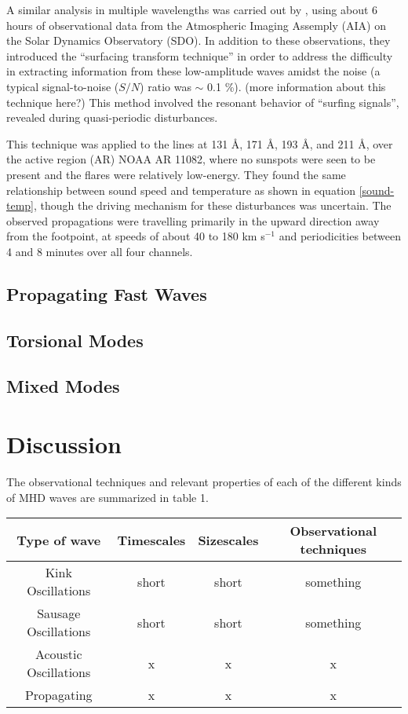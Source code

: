 \documentclass[preprint2]{aastex}
\begin{document}
A similar analysis in multiple wavelengths was carried out by
\cite{pac_2}, using about 6 hours of observational data from the
Atmospheric Imaging Assemply (AIA) on the Solar Dynamics Observatory (SDO).
In addition to these observations, they introduced the
``surfacing transform technique''
in order to address the difficulty in extracting information from these
low-amplitude waves amidst the noise (a typical signal-to-noise
($S/N$) ratio was $\sim$ 0.1 \%). (more information about this
technique here?)
This method involved the resonant behavior of ``surfing signals'',
revealed during quasi-periodic disturbances.

This technique was applied to the lines at
131 \AA{}, 171 \AA{}, 193 \AA{}, and 211 \AA{},
over the active region (AR) NOAA AR 11082, where no sunspots were seen
to be present and the flares were relatively low-energy.
They found the same relationship between sound speed and temperature
as shown in equation \ref{sound-temp}, though the driving mechanism
for these disturbances was uncertain. The observed propagations were
travelling primarily in the upward direction away from the footpoint,
at speeds of about 40 to 180 km s$^{-1}$ and periodicities between 4
and 8 minutes over all four channels.






\subsection{Propagating Fast Waves}
\subsection{Torsional Modes}
\subsection{Mixed Modes}




\section{Discussion}\label{disc}
The observational techniques and relevant properties of each of the different
kinds of MHD waves are summarized in table 1.
\begin{table*}[ht]
    \centering
    \begin{tabular}{c c c c}
        \toprule
        Type of wave &
        Timescales &
        Sizescales &
        Observational techniques\\
        \midrule
        Kink Oscillations & short & short & something\\
        Sausage Oscillations & short & short & something\\
        Acoustic Oscillations & x & x & x\\
        Propagating & x & x & x\\
        \bottomrule
    \end{tabular}
\end{table*}
\end{document}
